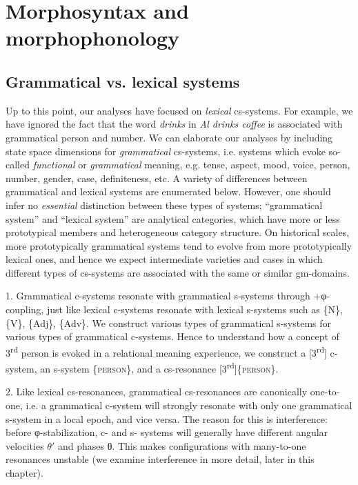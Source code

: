 \section{Morphosyntax and morphophonology}
\subsection{Grammatical vs. lexical systems}

Up to this point, our analyses have focused on \textit{lexical} cs-systems. For example, we have ignored the fact that the word \textit{drinks} in \textit{Al drinks coffee} is associated with grammatical person and number. We can elaborate our analyses by including state space dimensions for \textit{grammatical} cs-systems, i.e. systems which evoke so-called \textit{functional} or \textit{grammatical} meaning, e.g. tense, aspect, mood, voice, person, number, gender, case, definiteness, etc. A variety of differences between grammatical and lexical systems are enumerated below. However, one should infer no \textit{essential} distinction between these types of systems; “grammatical system” and “lexical system” are analytical categories, which have more or less prototypical members and heterogeneous category structure. On historical scales, more prototypically grammatical systems tend to evolve from more prototypically lexical ones, and hence we expect intermediate varieties and cases in which different types of cs-systems are associated with the same or similar gm-domains. 

1. Grammatical c-systems resonate with grammatical s-systems through +φ-coupling, just like lexical c-systems resonate with lexical s-systems such as \{N\}, \{V\}, \{Adj\}, \{Adv\}. We construct various types of grammatical s-systems for various types of grammatical c-systems. Hence to understand how a concept of 3\textsuperscript{rd} person is evoked in a relational meaning experience, we construct a [3\textsuperscript{rd}] c-system, an s-system \{\textsc{person}\}, and a cs-resonance [3\textsuperscript{rd}]\{\textsc{person}\}. 

2. Like lexical cs-resonances, grammatical cs-resonances are canonically one-to-one, i.e. a grammatical c-system will strongly resonate with only one grammatical s-system in a local epoch, and vice versa. The reason for this is interference: before φ-stabilization, c- and s- systems will generally have different angular velocities $\theta ′$ and phases θ. This makes configurations with many-to-one resonances unstable (we examine interference in more detail, later in this chapter).


